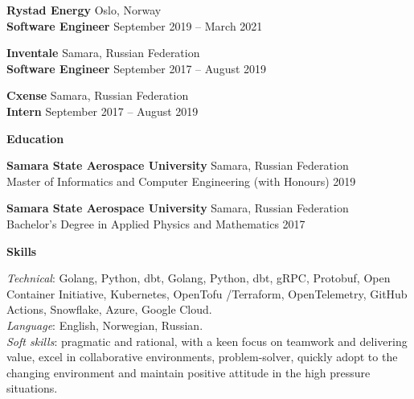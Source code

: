 \documentclass[12pt]{article}
\begin{document}
\vspace{10pt}

\textbf{Rystad Energy} \hfill Oslo, Norway \\
\textbf{Software Engineer} \hfill September 2019 – March 2021

\vspace{10pt}

\textbf{Inventale} \hfill Samara, Russian Federation \\
\textbf{Software Engineer} \hfill September 2017 – August 2019

\vspace{10pt}

\textbf{Cxense} \hfill Samara, Russian Federation \\
\textbf{Intern} \hfill September 2017 – August 2019

\hrulefill

\begin{center}
	\textbf{Education}
\end{center}

\textbf{Samara State Aerospace University} \hfill Samara, Russian Federation \\
Master of Informatics and Computer Engineering (with Honours) \hfill 2019

\textbf{Samara State Aerospace University} \hfill Samara, Russian Federation \\
Bachelor's Degree in Applied Physics and Mathematics \hfill 2017

\hrulefill

\begin{center}
	\textbf{Skills}
\end{center}

\textit{Technical}: Golang, Python, dbt, Golang, Python, dbt, gRPC, Protobuf, Open Container Initiative, Kubernetes, OpenTofu \slash Terraform, OpenTelemetry, GitHub Actions, Snowflake, Azure, Google Cloud. \\
\textit{Language}: English, Norwegian, Russian. \\
\textit{Soft skills}: pragmatic and rational, with a keen focus on teamwork and delivering value, excel in collaborative environments, problem-solver, quickly adopt to the changing environment and maintain positive attitude in the high pressure situations.
\end{document}
